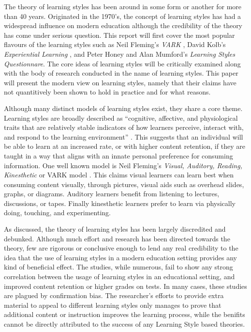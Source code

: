 \documentclass[12pt]{report}
\begin{document}
The theory of learning styles has been around in some form or another for more
than 40 years. Originated in the 1970's, the concept of learning styles has had
a widespread influence on modern education although the credibility of the
theory has come under serious question. This report will first cover the most
popular flavours of the learning styles such as Neil Fleming's \textit{VARK}
\cite{fleming2001teaching}, David Kolb's \textit{Experiential Learning}
\cite{kolb1984experiential}, and Peter Honey and Alan Mumford's \textit{Learning
Styles Questionnare}. The core ideas of learning styles will be critically
examined along with the body of research conducted in the name of learning
styles. This paper will present the modern view on learning styles, namely that
their claims have not quantitively been shown to hold in practice and for what
reasons.

Although many distinct models of learning styles exist, they share a core theme.
Learning styles are broadly described as ``cognitive, affective, and
physiological traits that are relatively stable indicators of how learners
perceive, interact with, and respond to the learning environment''
\cite{keefe1990developing}. This suggests that an individual will be able to
learn at an increased rate, or with higher content retention, if they are taught
in a way that aligns with an innate personal preference for consuming
information.  One well known model is Neil Fleming's \textit{Visual, Auditory, Reading,
Kinesthetic} or VARK model \cite{fleming2001teaching}. This claims visual learners can learn best when
consuming content visually, through pictures, visual aids such as overhead
slides, graphs, or diagrams. Auditory learners benefit from listening to
lectures, discussions, or tapes. Finally kinesthetic learners prefer to learn
via physically doing, touching, and experimenting.


As discussed, the theory of learning styles has been largely discredited and
debunked. Although much effort and research has been directed towards the
theory, few are rigorous or conclusive enough to lend any real credibility to
the idea that the use of learning styles in a modern education setting provides
any kind of beneficial effect. The studies, while numerous, fail to show any
strong correlation between the usage of learning styles in an educational
setting, and improved content retention or higher grades on tests. In many
cases, these studies are plagued by confirmation bias. The researcher's efforts
to provide extra material to appeal to different learning styles only manages to
prove that additional content or instruction improves the learning process,
while the benifits cannot be directly attributed to the success of any Learning
Style based theories.
\end{document}
